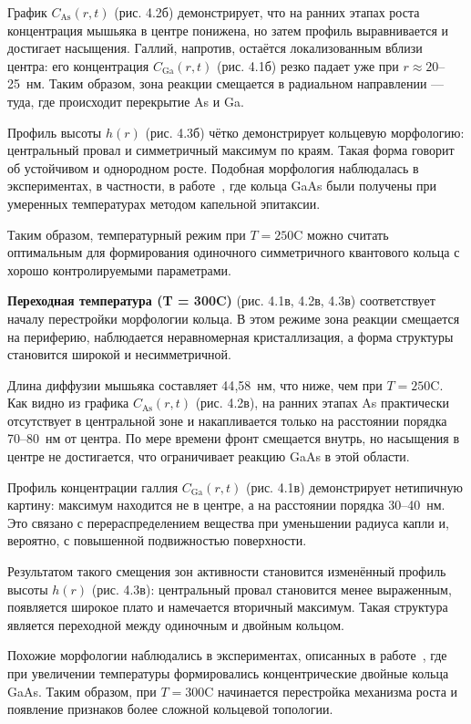 \documentclass[14pt,oneside]{extarticle}
\begin{document}
График $C_\mathrm{As}(r, t)$ (рис. 4.2б) демонстрирует, что на ранних этапах роста концентрация мышьяка в центре понижена, но затем профиль выравнивается и достигает насыщения. Галлий, напротив, остаётся локализованным вблизи центра: его концентрация $C_\mathrm{Ga}(r, t)$ (рис. 4.1б) резко падает уже при $r \approx 20$--25~нм. Таким образом, зона реакции смещается в радиальном направлении — туда, где происходит перекрытие As и Ga.

Профиль высоты $h(r)$ (рис. 4.3б) чётко демонстрирует кольцевую морфологию: центральный провал и симметричный максимум по краям. Такая форма говорит об устойчивом и однородном росте. Подобная морфология наблюдалась в экспериментах, в частности, в работе~\cite{mano2005nano}, где кольца GaAs были получены при умеренных температурах методом капельной эпитаксии.

Таким образом, температурный режим при $T = 250$\textdegree C можно считать оптимальным для формирования одиночного симметричного квантового кольца с хорошо контролируемыми параметрами.

\textbf{Переходная температура (T = 300\textdegree C)} (рис. 4.1в, 4.2в, 4.3в) соответствует началу перестройки морфологии кольца. В этом режиме зона реакции смещается на периферию, наблюдается неравномерная кристаллизация, а форма структуры становится широкой и несимметричной.

Длина диффузии мышьяка составляет 44{,}58~нм, что ниже, чем при $T = 250$\textdegree C. Как видно из графика $C_\mathrm{As}(r, t)$ (рис. 4.2в), на ранних этапах As практически отсутствует в центральной зоне и накапливается только на расстоянии порядка 70--80~нм от центра. По мере времени фронт смещается внутрь, но насыщения в центре не достигается, что ограничивает реакцию GaAs в этой области.

Профиль концентрации галлия $C_\mathrm{Ga}(r, t)$ (рис. 4.1в) демонстрирует нетипичную картину: максимум находится не в центре, а на расстоянии порядка 30--40~нм. Это связано с перераспределением вещества при уменьшении радиуса капли и, вероятно, с повышенной подвижностью поверхности.

Результатом такого смещения зон активности становится изменённый профиль высоты $h(r)$ (рис. 4.3в): центральный провал становится менее выраженным, появляется широкое плато и намечается вторичный максимум. Такая структура является переходной между одиночным и двойным кольцом.

Похожие морфологии наблюдались в экспериментах, описанных в работе~\cite{mano2005nano}, где при увеличении температуры формировались концентрические двойные кольца GaAs. Таким образом, при $T = 300$\textdegree C начинается перестройка механизма роста и появление признаков более сложной кольцевой топологии.
\end{document}
